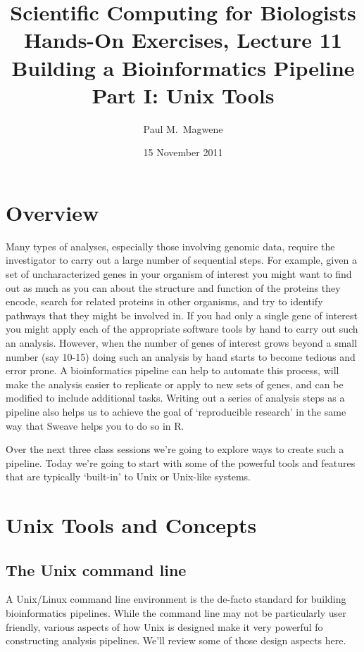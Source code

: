 \documentclass[10pt,letterpaper]{article}
\author{Paul M.~Magwene}
\title{
Scientific Computing for Biologists\\
Hands-On Exercises, Lecture 11\\
Building a Bioinformatics Pipeline\\
Part I: Unix Tools}
\date{15 November 2011}
\begin{document}
\maketitle
 
 
\section*{Overview}

Many types of analyses, especially those involving genomic data, require the investigator to carry out a large number of sequential steps. For example, given a set of uncharacterized genes in your organism of interest you might want to find out as much as you can about the structure and function of the proteins they encode, search for related proteins in other organisms, and try to identify pathways that they might be involved in. If you had only a single gene of interest you might apply each of the appropriate software tools by hand to carry out such an analysis. However, when the number of genes of interest grows beyond a small number (say 10-15) doing such an analysis by hand starts to become tedious and error prone.  A bioinformatics pipeline can help to automate this process, will make the analysis easier to replicate or apply to new sets of genes, and can be modified to include additional tasks.  Writing out a series of analysis steps as a pipeline also helps us to achieve the goal of `reproducible research' in the same way that Sweave helps you to do so in R.

Over the next three class sessions we're going to explore ways to create such a pipeline. Today we're going to start with some of the powerful tools and features that are typically `built-in' to Unix or Unix-like systems.

\section*{Unix Tools and Concepts}

\subsection*{The Unix command line}

A Unix/Linux command line environment is the de-facto standard for building bioinformatics pipelines. While the command line may not be particularly user friendly, various aspects of how Unix is designed make it very powerful fo constructing analysis pipelines.  We'll review some of those design aspects here.
\end{document}
